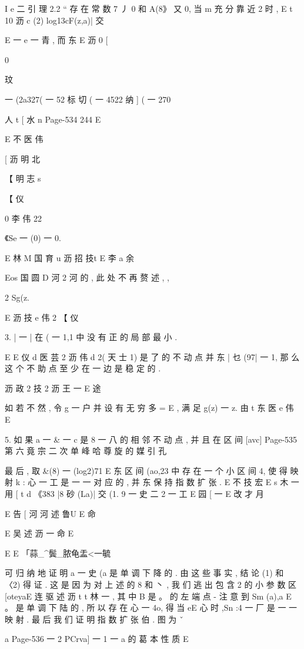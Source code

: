 {{I
e 二
引 理 2.2 “ 存 在 常 数 7 丿 0 和 A(8》 又 0, 当 m 充 分 靠 近 2 时 ,
E
t
10 沥 c
(2) log13cF(z,a)| 交

E 一 e 一 青 , 而 东
E 沥
0
[

0

玟

一 (2a327( 一 52 标 切 ( 一 4522 纳 ] ( 一 270

人
t
[ 水
n
Page-534
244 E

E 不 医 伟

[ 沥 明 北

【 明 志 s

【 仪

0 李 伟 22

《Se 一 (0) 一 0.

E 林 M 国 育 u 沥 招 技t
E 李 a 余

Eos 国 圆 D 河 2 河
的 , 此 处 不 再 赘 述 , ,

2
Sg(z.

E 沥 技 e 伟 2
【 仪

3. | 一 | 在 ( 一 1,1 中 没 有 正 的 局 部 最 小 .

E
E 仪 d
医 芸 2 沥 伟
d
2( 天 士 1) 是 了 的 不 动 点 并 东 | 乜 (97| 一 1, 那 么 这 个 不 助 点 至 少
在 一 边 是 稳 定 的 .

沥 政 2 技
2 沥 王 一
E 途

如 若 不 然 , 令 g 一 户 并 设 有 无 穷 多 = E , 满 足 g(z) 一 z. 由
t 东
医 e 伟
E

5. 如 果 a 一 & 一 c 是 8 一 八 的 相 邻 不 动 点 , 并 且 在 区 间 [avc]
Page-535
第 六 竟 宗 二 次 单 峰 哈 尊 旋 的 媒 引 孔

最 后 , 取 &(8) 一 (log2)71 E
东
区 间 (ao,23 中 存 在 一 个 小 区 间 4, 使 得 映 射 k : 心 一 工 是 一 一 对
应 的 , 并 东 保 持 指 数 扩 张 .
E 不 技 宏
E
s 木 一 用
[ t d
《383 |8 砂 (La)| 交 (1. 9 一 史 二 2 一 工
E 园
[ 一
E 改 才 月

E 告 [ 河 河 述 鲁U E 命

E 吴 述 沥 一 命
E

E E
「蒜_^鬓_脓龟盂<一毓

可 归 纳 地 证 明 a 一 史 (a 是 单 调 下 降 的 . 由 这 些 事 实 , 结 论 (1) 和
〈2) 得 证 . 这 是 因 为 对 上 述 的 8 和 丶 , 我 们 逃 出 包 含 2 的 小 参 数 区
[oteyaE 连 驱 述 沥 t
t 林
一 , 其 中 B 是 。 的 左 端 点 - 注 意 到 Sm (a),a E 。 是 单 调 下 陆
的 , 所 以 存 在 心 一 4o, 得 当 eE 心 时 ,Sn :4 一 厂 是 一 一 映 射 . 最
后 我 们 证 明 指 数 扩 张 伯 . 图 为 ˇ

a
Page-536
一 2 PCrva] 一 1 一 a 的 葛 本 性 质 E

}}
